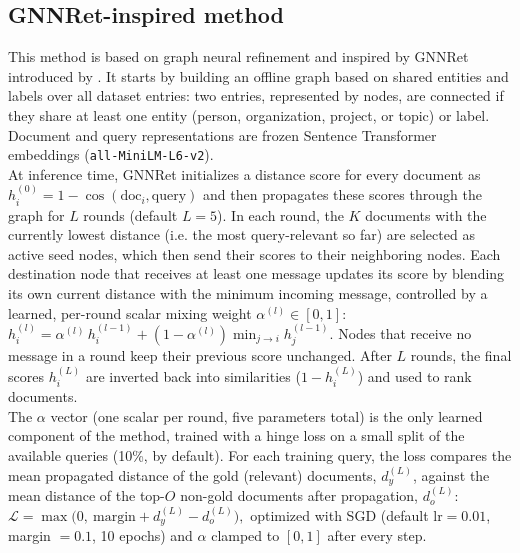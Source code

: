 \documentclass[11pt]{article}
\begin{document}
\subsection{GNNRet-inspired method}
\label{subsec:GNNRet}
This method is based on graph neural refinement and inspired by GNNRet introduced by \citet{li_graph_2024}. It starts by building an offline graph based on shared entities and labels over all dataset entries: two entries, represented by nodes, are connected if they share at least one entity (person, organization, project, or topic) or label. Document and query representations are frozen Sentence Transformer embeddings (\texttt{all-MiniLM-L6-v2}).\\
At inference time, GNNRet initializes a distance score for every document as $h_i^{(0)} = 1 - \cos(\mathrm{doc}_i, \mathrm{query})$ and then propagates these scores through the graph for $L$ rounds (default $L=5$). In each round, the $K$ documents with the currently lowest distance (i.e. the most query-relevant so far) are selected as active seed nodes, which then send their scores to their neighboring nodes. Each destination node that receives at least one message updates its score by blending its own current distance with the minimum incoming message, controlled by a learned, per-round scalar mixing weight $\alpha^{(l)} \in [0,1]$:
\(
h_i^{(l)} = \alpha^{(l)} \, h_i^{(l-1)} + (1-\alpha^{(l)}) \min_{j \to i} h_j^{(l-1)}.
\)
Nodes that receive no message in a round keep their previous score unchanged. After $L$ rounds, the final scores $h_i^{(L)}$ are inverted back into similarities ($1-h_i^{(L)}$) and used to rank documents.\\
The $\alpha$ vector (one scalar per round, five parameters total) is the only learned component of the method, trained with a hinge loss on a small split of the available queries (10\%, by default). For each training query, the loss compares the mean propagated distance of the gold (relevant) documents, $d_y^{(L)}$, against the mean distance of the top-$O$ non-gold documents after propagation, $d_o^{(L)}$:
\(
\mathcal{L} = \max\bigl(0,\ \text{margin} + d_y^{(L)} - d_o^{(L)}\bigr),
\)
optimized with SGD (default $\text{lr}=0.01$, margin $=0.1$, 10 epochs) and $\alpha$ clamped to $[0,1]$ after every step.
\end{document}
